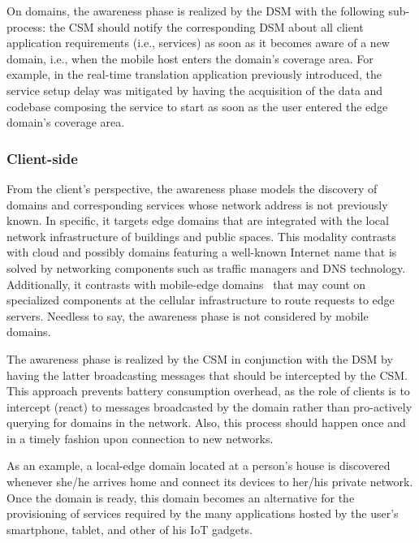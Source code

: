 On domains, the awareness phase is realized by the DSM with the following sub-process: the CSM should notify the corresponding DSM about all client application requirements (i.e., services) as soon as it becomes aware of a new domain, i.e., when the mobile host enters the domain's coverage area. For example, in the real-time translation application previously introduced, the service setup delay was mitigated by having the acquisition of the data and codebase composing the service to start as soon as the user entered the edge domain's coverage area.

\subsubsection*{Client-side} From the client's perspective, the awareness phase models the discovery of domains and corresponding services whose network address is not previously known. In specific, it targets edge domains that are integrated with the local network infrastructure of buildings and public spaces. This modality contrasts with cloud and possibly domains featuring a well-known Internet name that is solved by networking components such as traffic managers and DNS technology. Additionally, it contrasts with mobile-edge domains~\cite{ahmed2016isco} that may count on specialized components at the cellular infrastructure to route requests to edge servers. Needless to say, the awareness phase is not considered by mobile domains.

The awareness phase is realized by the CSM in conjunction with the DSM by having the latter broadcasting messages that should be intercepted by the CSM. This approach prevents battery consumption overhead, as the role of clients is to intercept (react) to messages broadcasted by the domain rather than pro-actively querying for domains in the network. Also, this process should happen once and in a timely fashion upon connection to new networks. 

As an example, a local-edge domain located at a person's house is discovered whenever she/he arrives home and connect its devices to her/his private network. Once the domain is ready, this domain becomes an alternative for the provisioning of services required by the many applications hosted by the user's smartphone, tablet, and other of his IoT gadgets. %



